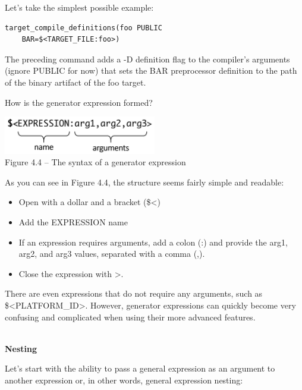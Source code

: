 
Let's take the simplest possible example:

\begin{lstlisting}[style=styleCMake]
target_compile_definitions(foo PUBLIC
	BAR=$<TARGET_FILE:foo>)
\end{lstlisting}

The preceding command adds a -D definition flag to the compiler's arguments (ignore PUBLIC for now) that sets the BAR preprocessor definition to the path of the binary artifact of the foo target.

How is the generator expression formed?

\begin{center}
\includegraphics[width=0.5\textwidth]{content/2/chapter4/images/4.jpg}\\
Figure 4.4 – The syntax of a generator expression
\end{center}

As you can see in Figure 4.4, the structure seems fairly simple and readable:

\begin{itemize}
\item 
Open with a dollar and a bracket (\$<)

\item 
Add the EXPRESSION name

\item 
If an expression requires arguments, add a colon (:) and provide the arg1, arg2, and arg3 values, separated with a comma (,).

\item 
Close the expression with >.
\end{itemize}

There are even expressions that do not require any arguments, such as \$<PLATFORM\_ID>. However, generator expressions can quickly become very confusing and complicated when using their more advanced features.

\hspace*{\fill} \\ %
\noindent
\textbf{Nesting}

Let's start with the ability to pass a general expression as an argument to another expression or, in other words, general expression nesting:

